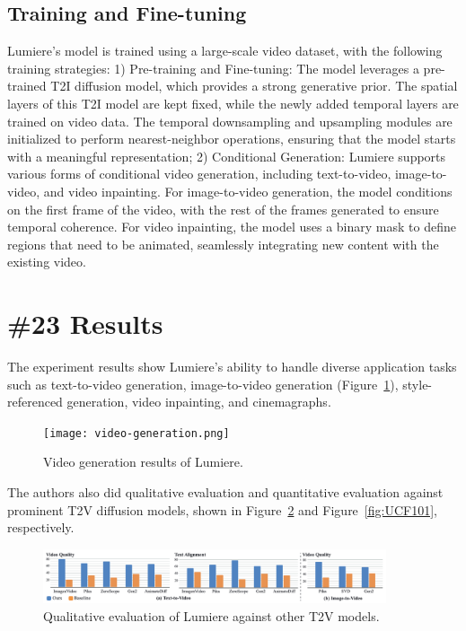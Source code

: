 \documentclass[conference]{IEEEtran}
\theoremstyle{definition}
\theoremstyle{plain}
\theoremstyle{remark}
\begin{document}
\subsection{Training and Fine-tuning}
Lumiere's model is trained using a large-scale video dataset, with the following training strategies:
1) Pre-training and Fine-tuning:
The model leverages a pre-trained T2I diffusion model, which provides a strong generative prior. The spatial layers of this T2I model are kept fixed, while the newly added temporal layers are trained on video data.
The temporal downsampling and upsampling modules are initialized to perform nearest-neighbor operations, ensuring that the model starts with a meaningful representation;
2) Conditional Generation:
Lumiere supports various forms of conditional video generation, including text-to-video, image-to-video, and video inpainting.
For image-to-video generation, the model conditions on the first frame of the video, with the rest of the frames generated to ensure temporal coherence.
For video inpainting, the model uses a binary mask to define regions that need to be animated, seamlessly integrating new content with the existing video.

\section{\textbf{\#23} Results}
The experiment results show Lumiere's ability to handle diverse application tasks such as text-to-video generation, image-to-video generation (Figure~\ref{fig:video-generation}), style-referenced generation, video inpainting, and cinemagraphs.
\begin{figure}[!htbp]
    \centering
    \texttt{[image: video-generation.png]}
    \caption{Video generation results of Lumiere.}
    \label{fig:video-generation}
\end{figure}

The authors also did qualitative evaluation and quantitative evaluation against prominent T2V diffusion models, 
shown in Figure~\ref{fig:user-study} and Figure~\ref{fig:UCF101}, respectively.


\begin{figure}
    \centering
    \includegraphics[width=0.9\textwidth]{User-study.png}
    \caption{Qualitative evaluation of Lumiere against other T2V models.}
    \label{fig:user-study}
\end{figure}
\end{document}
